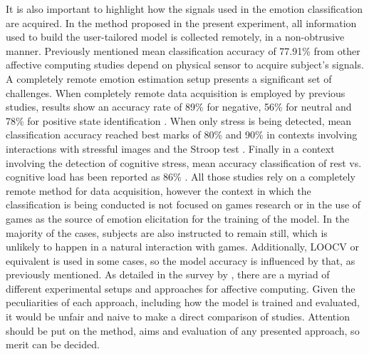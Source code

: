 It is also important to highlight how the signals used in the emotion classification are acquired. In the method proposed in the present experiment, all information used to build the user-tailored model is collected remotely, in a non-obtrusive manner. Previously mentioned mean classification accuracy of 77.91\% from other affective computing studies depend on physical sensor to acquire subject's signals. A completely remote emotion estimation setup presents a significant set of challenges. When completely remote data acquisition is employed by previous studies, results show an accuracy rate of 89\% for negative, 56\% for neutral and 78\% for positive state identification \parencite{mental}. When only stress is being detected, mean classification accuracy reached best marks of 80\% and 90\% in contexts involving interactions with stressful images and the Stroop test \parencite{giannakakis2017stress}. Finally in a context involving the detection of cognitive stress, mean accuracy classification of rest vs. cognitive load has been reported as 86\% \parencite{mcduffcogcam}. All those studies rely on a completely remote method for data acquisition, however the context in which the classification is being conducted is not focused on games research or in the use of games as the source of emotion elicitation for the training of the model. In the majority of the cases, subjects are also instructed to remain still, which is unlikely to happen in a natural interaction with games. Additionally, LOOCV or equivalent is used in some cases, so the model accuracy is influenced by that, as previously mentioned. As detailed in the survey by \textcite{moghimi2017affective}, there are a myriad of different experimental setups and approaches for affective computing. Given the peculiarities of each approach, including how the model is trained and evaluated, it would be unfair and naive to make a direct comparison of studies. Attention should be put on the method, aims and evaluation of any presented approach, so merit can be decided.

